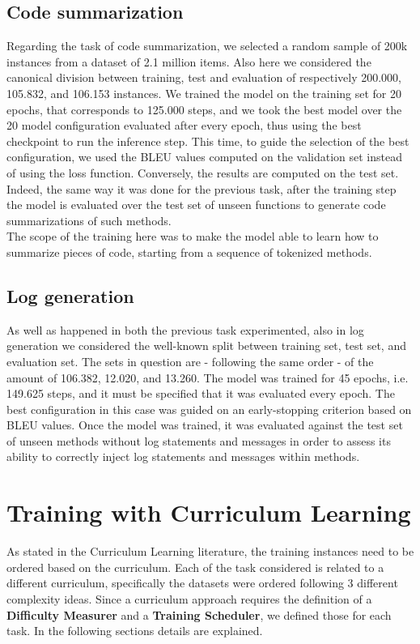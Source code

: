 \subsection{Code summarization}
Regarding the task of code summarization, we selected a random sample of 200k instances from a dataset of 2.1 million items.
Also here we considered the canonical division between training, test and evaluation of respectively 200.000, 105.832, and 106.153 instances.
We trained the model on the training set for 20 epochs, that corresponds to 125.000 steps, and we took the best model over the 20 model configuration evaluated after every epoch,
thus using the best checkpoint to run the inference step. This time, to guide the selection of the best configuration, we used the BLEU values computed on the validation set instead of using
the loss function. Conversely, the results are computed on the test set. Indeed, the same way it was done for the previous task, after the training step the model is
evaluated over the test set of unseen functions to generate code summarizations of such methods.\\
The scope of the training here 
was to make the model able to learn how to summarize pieces of code, starting from a sequence of tokenized methods.

\subsection{Log generation}
As well as happened in both the previous task experimented, also in log generation we considered the well-known split between training set, test set, and evaluation set.
The sets in question are - following the same order - of the amount of 106.382, 12.020, and 13.260. The model was trained for 45 epochs, i.e. 149.625 steps, and 
it must be specified that it was evaluated every epoch. The best configuration in this case was guided on an early-stopping criterion based on BLEU values. 
Once the model was trained, it was evaluated against the test set of unseen methods without log statements and messages in order to assess its ability to correctly inject log statements and messages within methods.

\section{Training with Curriculum Learning}

As stated in the Curriculum Learning literature, the training instances need to be ordered based on the curriculum.
Each of the task considered is related to a different curriculum, specifically the datasets were ordered
following 3 different complexity ideas. Since a curriculum approach requires the definition of a \textbf{Difficulty Measurer}
and a \textbf{Training Scheduler}, we defined those for each task. In the following sections details are explained.

